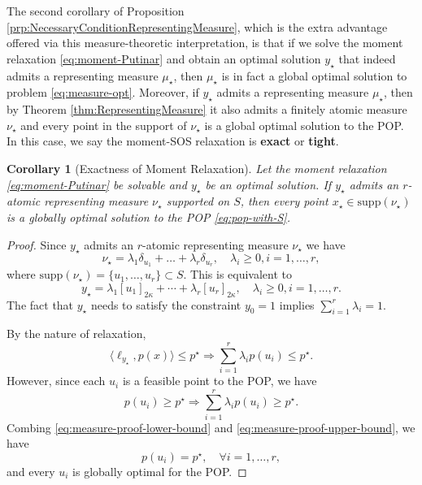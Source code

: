 \documentclass[
]{book}
\newtheorem{corollary}{Corollary}[chapter]
\theoremstyle{definition}
\theoremstyle{definition}
\theoremstyle{definition}
\theoremstyle{definition}
\theoremstyle{remark}
\begin{document}
The second corollary of Proposition \ref{prp:NecessaryConditionRepresentingMeasure}, which is the extra advantage offered via this measure-theoretic interpretation, is that if we solve the moment relaxation \eqref{eq:moment-Putinar} and obtain an optimal solution \(y_\star\) that indeed admits a representing measure \(\mu_\star\), then \(\mu_\star\) is in fact a global optimal solution to problem \eqref{eq:measure-opt}. Moreover, if \(y_\star\) admits a representing measure \(\mu_\star\), then by Theorem \ref{thm:RepresentingMeasure} it also admits a finitely atomic measure \(\nu_\star\) and every point in the support of \(\nu_\star\) is a global optimal solution to the POP. In this case, we say the moment-SOS relaxation is \textbf{exact} or \textbf{tight}.

\begin{corollary}[Exactness of Moment Relaxation]
\protect\hypertarget{cor:ExactnessOfRelaxation}{}\label{cor:ExactnessOfRelaxation}Let the moment relaxation \eqref{eq:moment-Putinar} be solvable and \(y_\star\) be an optimal solution. If \(y_\star\) admits an \(r\)-atomic representing measure \(\nu_\star\) supported on \(S\), then every point \(x_\star \in \mathrm{supp}(\nu_\star)\) is a globally optimal solution to the POP \eqref{eq:pop-with-S}.
\end{corollary}

\begin{proof}
Since \(y_\star\) admits an \(r\)-atomic representing measure \(\nu_\star\) we have
\[
\nu_\star = \lambda_1 \delta_{u_1} + \dots + \lambda_r \delta_{u_r}, \quad \lambda_i \geq 0, i=1,\dots,r,
\]
where \(\mathrm{supp}(\nu_\star) = \{ u_1,\dots,u_r \} \subset S\). This is equivalent to
\[
y_\star = \lambda_1 [u_1]_{2\kappa} + \cdots + \lambda_r [u_r]_{2\kappa}, \quad \lambda_i \geq 0, i=1,\dots,r.
\]
The fact that \(y_\star\) needs to satisfy the constraint \(y_0 = 1\) implies \(\sum_{i=1}^r \lambda_i = 1\).

By the nature of relaxation,
\begin{equation}
\langle \ell_{y_\star}, p(x) \rangle \leq p^\star \Rightarrow \sum_{i=1}^r \lambda_i p(u_i) \leq p^\star.
\label{eq:measure-proof-lower-bound}
\end{equation}
However, since each \(u_i\) is a feasible point to the POP, we have
\begin{equation}
p(u_i) \geq p^\star \Rightarrow \sum_{i=1}^r \lambda_i p(u_i) \geq p^\star.
\label{eq:measure-proof-upper-bound}
\end{equation}
Combing \eqref{eq:measure-proof-lower-bound} and \eqref{eq:measure-proof-upper-bound}, we have
\[
p(u_i) = p^\star, \quad \forall i=1,\dots,r,
\]
and every \(u_i\) is globally optimal for the POP.
\end{proof}
\end{document}
